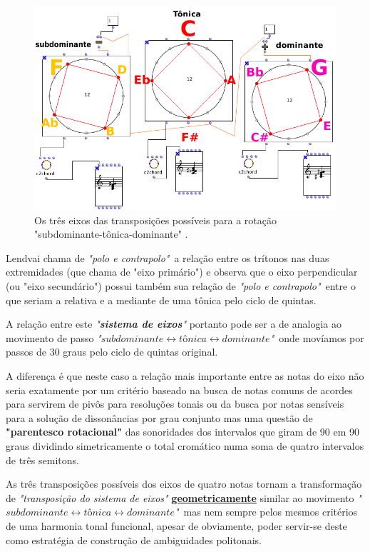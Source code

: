 \documentclass[
	12pt,				%
	openright,			%
	twoside,			%
	a4paper,			%
	english,			%
	french,				%
	spanish,			%
	brazil				%
	]{abntex2}
\begin{document}
\begin{figure}[!h]
	\caption{\label{fig_grafico}Os três eixos das transposições possíveis para a rotação "subdominante-tônica-dominante" .}
	\begin{center}
	    \includegraphics[scale=0.45]{axis/axisOM.png}
	\end{center}
\end{figure}


Lendvai chama de \textit{"polo e contrapolo"}\ a relação entre os trítonos nas duas extremidades (que chama de "eixo primário") e observa que o eixo perpendicular (ou "eixo secundário") possui também sua relação de \textit{"polo e contrapolo"}\ entre o que seriam a relativa e a mediante de uma tônica pelo ciclo de quintas. 

A relação entre este \textit{"\textbf{sistema de eixos}"} portanto pode ser a de analogia ao movimento de passo \textit{"$subdominante \leftrightarrow tônica \leftrightarrow dominante$"}\ onde movíamos por passos de 30 graus pelo ciclo de quintas original.  

A diferença é que neste caso a relação mais importante entre as notas do eixo não seria exatamente por um critério baseado na busca de notas comuns de acordes para servirem de pivôs para resoluções tonais ou da busca por notas sensíveis para a solução de dissonâncias por grau conjunto mas uma questão de \textbf{"\textbf{parentesco rotacional}"} das sonoridades dos intervalos que giram de 90 em 90 graus dividindo simetricamente o total cromático numa soma de quatro intervalos de três semitons.

As três transposições possíveis dos eixos de quatro notas tornam a transformação de \textit{"transposição do sistema de eixos"} \textbf{\textbf{\underline{geometricamente}}} similar ao movimento \textit{"$subdominante \leftrightarrow tônica \leftrightarrow dominante$"}\ mas nem sempre pelos mesmos critérios de uma harmonia tonal funcional, apesar de obviamente, poder servir-se deste como estratégia de construção de ambiguidades politonais.
\end{document}
